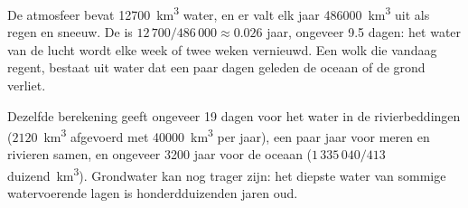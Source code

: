 \begin{example}\label{ex:g10:freshwater-resources:atmosphere}
De atmosfeer bevat \num{12700}~\unit{km^3} water, en er valt elk jaar
\num{486000}~\unit{km^3} uit als regen en sneeuw. De  is
$12\,700/486\,000 \approx \num{0.026}$ jaar, ongeveer \num{9.5} dagen: het
water van de lucht wordt elke week of twee weken vernieuwd. Een wolk die vandaag
regent, bestaat uit water dat een paar dagen geleden de oceaan of de grond
verliet.
\end{example}

Dezelfde berekening geeft ongeveer \num{19} dagen voor het water in de
rivierbeddingen ($2120$~\unit{km^3} afgevoerd met \num{40000}~\unit{km^3} per
jaar), een paar jaar voor meren en rivieren samen, en ongeveer \num{3200} jaar
voor de oceaan ($1\,335\,040/413$ duizend~\unit{km^3}). Grondwater kan nog trager
zijn: het diepste water van sommige watervoerende lagen is honderdduizenden jaren
oud.


